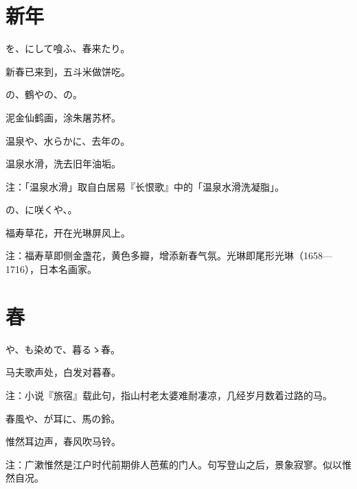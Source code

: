 \newpage

\section{\FK 新年}

\setcounter{haikucounter}{0}

\begin{haiku}
    {\FH {}を、にして喰ふ、春来たり。}

    {\FK 新春已来到，五斗米做饼吃。}
\end{haiku}

\begin{haiku}
    {\FH {}の、鶴やの、の。}

    {\FK 泥金仙鹤画，涂朱屠苏杯。}
\end{haiku}

\begin{haiku}
    {\FH 温泉や、水らかに、去年の。}

    {\FK 温泉水滑，洗去旧年油垢。}

    {\FT 注：「温泉水滑」取自白居易『长恨歌』中的「温泉水滑洗凝脂」。}
\end{haiku}

\begin{haiku}
    {\FH {}の、に咲くや、。}

    {\FK 福寿草花，开在光琳屏风上。}

    {\FT 注：福寿草即侧金盏花，黄色多瓣，增添新春气氛。光琳即尾形光琳（1658—1716），日本名画家。}
\end{haiku}

\section{\FK 春}

\setcounter{haikucounter}{0}

\begin{haiku}
    {\FH {}や、も染めで、暮るゝ春。}

    {\FK 马夫歌声处，白发对暮春。}

    {\FT 注：小说『旅宿』载此句，指山村老太婆难耐凄凉，几经岁月数着过路的马。}
\end{haiku}

\begin{haiku}
    {\FH 春風や、が耳に、馬の鈴。}

    {\FK 惟然耳边声，春风吹马铃。}

    {\FT 注：广漱惟然是江户时代前期俳人芭蕉的门人。句写登山之后，景象寂寥。似以惟然自况。}
\end{haiku}

